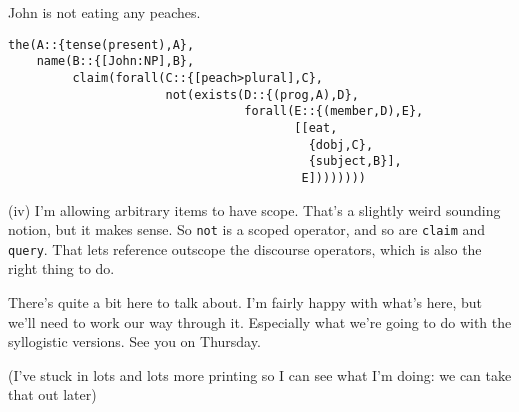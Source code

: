 \documentclass[11pt]{article}
\begin{document}
\begin{examples}
\item
John is not eating any peaches.

\begin{Verbatim}[commandchars=\\\{\}]
the(A::{tense(present),A},
    name(B::{[John:NP],B},
         claim(forall(C::{[peach>plural],C},
                      not(exists(D::{(prog,A),D},
                                 forall(E::{(member,D),E},
                                        [[eat,
                                          {dobj,C},
                                          {subject,B}],
                                         E])))))))
\end{Verbatim}
\end{examples}

\medpara
(iv) I'm allowing arbitrary items to have scope. That's a slightly
weird sounding notion, but it makes sense. So \texttt{not} is a scoped
operator, and so are \texttt{claim} and \texttt{query}. That lets
reference outscope the discourse operators, which is also the right
thing to do. 

\noindent
There's quite a bit here to talk about. I'm fairly happy with what's
here, but we'll need to work our way through it. Especially what we're
going to do with the syllogistic versions. See you on Thursday. 

\medpara
(I've stuck in lots and lots more printing so I can see what I'm
doing: we can take that out later)
\end{document}
